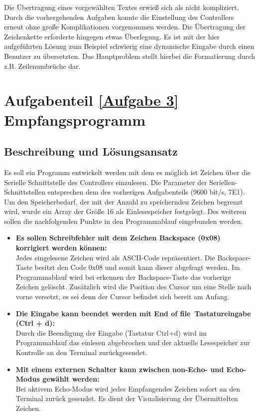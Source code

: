 	Die Übertragung eines vorgewählten Textes erwieß sich als nicht kompliziert. Durch die vorhergehenden Aufgaben konnte die Einstellung des Controllers erneut ohne große Komplikationen vorgenommen werden.  Die Übertragung der Zeichenkette erforderte hingegen etwas Überlegung. Es ist mit der hier aufgeführten Lösung zum Beispiel schwierig eine dynamische Eingabe durch einen Benutzer zu übersetzten. Das Hauptproblem stellt hierbei die Formatierung durch z.B. Zeilenumbrüche dar.
	
	\newpage
	
	\section{Aufgabenteil \ref{Aufgabe 3} Empfangsprogramm}
	
	\subsection{Beschreibung und Lösungsansatz}
	Es soll ein Programm entwickelt werden mit dem es möglich ist Zeichen über die Serielle Schnittstelle des Controllers einzulesen. Die Parameter der Seriellen-Schnittstellen entsprechen dem des vorherigen Aufgabenteils (9600 bit/s, 7E1). Um den Speicherbedarf, der mit der Anzahl zu speichernden Zeichen begrenzt wird, wurde ein Array der Größe 16 als Einlesespeicher festgelegt. Des weiteren sollen die nachfolgenden Punkte in den Programmablauf eingebunden werden.
	
	\begin{itemize}
		\item \textbf{Es sollen Schreibfehler mit dem Zeichen Backspace (0x08) korrigiert werden können:}\\
		Jedes eingelesene Zeichen wird als ASCII-Code repräsentiert. Die Backspace-Taste besitzt den Code 0x08 und somit kann dieser abgefragt werden. Im Programmablauf wird bei erkennen der Backspace-Taste das vorherige Zeichen gelöscht. Zusätzlich wird die Position des Cursor um eine Stelle nach vorne versetzt, es sei denn der Cursor befindet sich bereit am Anfang.
		\item \textbf{Die Eingabe kann beendet werden mit \glqq End of file\grqq~Tastatureingabe (Ctrl + d):}\\
		Durch die Beendigung der Eingabe (Tastatur Ctrl+d) wird im Programmablauf das einlesen abgebrochen und der aktuelle Lesespeicher zur Kontrolle an den Terminal zurückgesendet.
		\item \textbf{Mit einem externen Schalter kann zwischen non-Echo- und Echo-Modus gewählt werden:}\\
		Bei aktivem Echo-Modus wird jedes Empfangendes Zeichen sofort an den Terminal zurück gesendet. Es dient der Visualisierung der Übermittelten Zeichen.
		
	\end{itemize}
	

